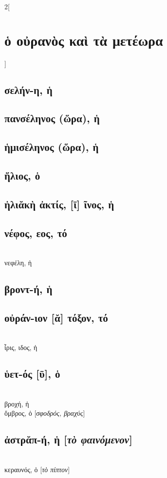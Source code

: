 \documentclass{book}
\begin{document}
\begin{multicols}{2}[\section{ὁ οὐρανὸς καὶ τὰ μετέωρα}]
\subsection{σελήν-η, ἡ}
\subsection{πανσέληνος (ὥρα), ἡ}
\subsection{ἡμισέληνος (ὥρα), ἡ}
\subsection{ἥλιος, ὁ}
\subsection{ἡλιᾰκὴ ἀκτίς, [ῑ] ῖνος, ἡ}
\subsection{νέφος, εος, τό}
 ~\\
νεφέλη, ἡ 
\subsection{βροντ-ή, ἡ}
\subsection{οὐράν-ιον [ᾰ] τόξον, τό}
 ~\\
ἶρις, ιδος, ἡ 
\subsection{ὑετ-ός [ῡ], ὁ}
 ~\\
βροχή, ἡ  ~\\
ὄμβρος, ὁ [\textit{σφοδρός, βραχύς}]
\subsection{ἀστρᾰπ-ή, ἡ [\textit{τὸ φαινόμενον}]}
 ~\\
κεραυνός, ὁ [\textit{τὸ πίπτον}]

\end{multicols}
\end{document}
